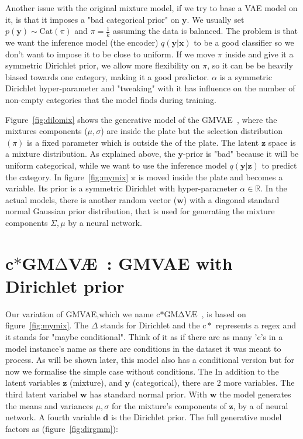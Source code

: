 \documentclass[11pt, a4paper]{report}
\theoremstyle{plain}
\theoremstyle{definition}
\theoremstyle{remark}
\newcommand{\R}{\mathbb{R}}
\newcommand{\x}{\mathbf{x}}
\newcommand{\z}{\mathbf{z}}
\newcommand{\y}{\mathbf{y}}
\newcommand{\w}{\mathbf{w}}
\newcommand{\dd}{\mathbf{d}}
\newcommand{\gmvae}{c$\ast$GM$\mathrm{\Delta}$V\AE~}
\begin{document}
Another issue with the original mixture model, if we try to base a VAE model on
it, is that it imposes a "bad categorical prior" on $\y$. We usually set $p(\y) \sim
\text{Cat}(\pi)$ and $\pi=\frac{1}{k}$ assuming the data is balanced. The
problem is that we want the inference model (the encoder) $q(\y | \x)$ to be a
good classifier so we don't want to impose it to be close to uniform. 
If we move
$\pi$ inside and give it a symmetric Dirichlet prior, we allow more
flexibility on $\pi$, so it can be be heavily biased towards one category, making it a good
predictor. $\alpha$ is a symmetric Dirichlet hyper-parameter and "tweaking" with
it has influence on the number of non-empty categories that the model finds
during training.

Figure~\ref{fig:dilomix} shows the generative model of the
GMVAE~\cite{dilokthanakul2016deep}, where the mixtures components ($\mu,
\sigma$) are inside the plate but the selection distribution $(\pi)$ is a fixed
parameter which is outside the of the plate. The latent $\z$ space is a mixture
distribution. As explained above, the $\y$-prior is "bad" because it will be
uniform categorical, while we want to use the inference model $q(\y | \z)$ to
predict the category. In figure~\ref{fig:mymix} $\pi$ is moved inside the plate
and becomes a variable. Its prior is a symmetric Dirichlet with hyper-parameter
$\alpha \in \R$. In the actual models, there is another random vector ($\w$) with  
a diagonal standard normal Gaussian prior distribution, that is used for
generating the
mixture components $\Sigma, \mu$ by a neural network.

\section{\gmvae: GMVAE with Dirichlet prior}

Our variation of GMVAE,which we name \gmvae, is based on figure~\ref{fig:mymix}.
The $\Delta$ stands for Dirichlet and the $\mathrm{c}\ast$ represents a regex
and it stands for "maybe
conditional". Think of it as if there are as many 'c's in a model instance's
name as
there are conditions in the dataset it was meant to process. As will be shown later,
this model also has a conditional
version but for now we formalise the simple case without conditions. The 
In addition to the latent variables $\z$ (mixture), and $\y$ (categorical), there
are 2 more variables.
The third latent variabel $\w$ has standard normal prior.
With $\w$ the model generates the means and variances $\mu,
\sigma$ for the mixture's components of $\z$, by a of neural network.
A fourth variable $\dd$ is the Dirichlet prior.
The full generative model factors as (figure~\ref{fig:dirgmm}):
\end{document}
